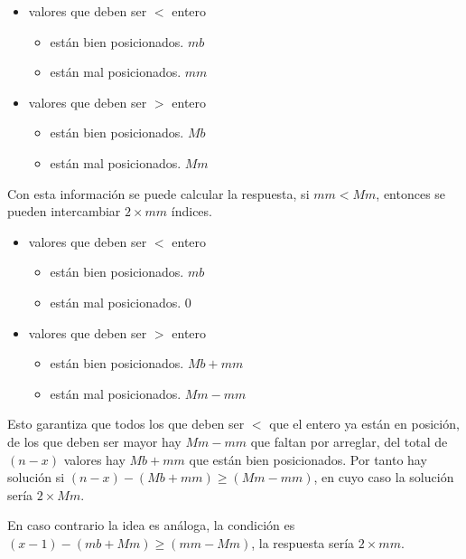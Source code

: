 \documentclass[14pt]{extarticle}
\begin{document}
\begin{itemize}
    \item valores que deben ser $<$ entero
    \begin{itemize}
        \item están bien posicionados. $mb$
        \item están mal posicionados. $mm$
    \end{itemize}
    \item valores que deben ser $>$ entero
    \begin{itemize}
        \item están bien posicionados. $Mb$
        \item están mal posicionados. $Mm$
    \end{itemize}
\end{itemize}

Con esta información se puede calcular la respuesta, si $mm < Mm$, entonces se pueden intercambiar $2 \times mm$ índices.

\begin{itemize}
    \item valores que deben ser $<$ entero
    \begin{itemize}
        \item están bien posicionados. $mb$
        \item están mal posicionados. $0$
    \end{itemize}
    \item valores que deben ser $>$ entero
    \begin{itemize}
        \item están bien posicionados. $Mb + mm$
        \item están mal posicionados. $Mm - mm$
    \end{itemize}
\end{itemize}

Esto garantiza que todos los que deben ser $<$ que el entero ya están en posición, de los que deben ser mayor hay $Mm - mm$ que faltan por arreglar, del total de $(n-x)$ valores hay $Mb + mm$ que están bien posicionados. Por tanto hay solución si $(n-x) - (Mb+mm) \geq (Mm - mm)$, en cuyo caso la solución sería $2 \times Mm$.

En caso contrario la idea es análoga, la condición es $(x-1) - (mb + Mm) \geq (mm - Mm)$, la respuesta sería $2 \times mm$.
\end{document}
